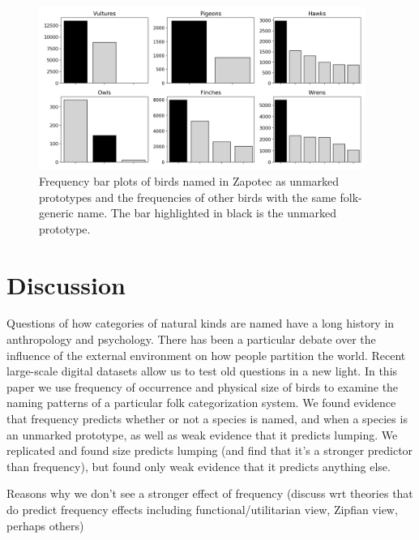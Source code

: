 \documentclass[10pt,letterpaper]{article}
\begin{document}
\begin{figure}[ht!]
  \begin{center}
    \includegraphics[width=0.95\textwidth]{./figures/prototypes-barplots-all.png}
        \caption{Frequency bar plots of birds named in Zapotec as unmarked prototypes and the frequencies of other birds with the same folk-generic name. The bar highlighted in black is the unmarked prototype.}
        \label{fig-freq-prototype-all}
  \end{center}
\end{figure}






\section{Discussion}


Questions of how categories of natural kinds are named have a long history in anthropology and psychology. There has been a particular debate over the influence of the external environment on how people partition the world. Recent large-scale digital datasets allow us to test old questions in a new light. In this paper we use frequency of occurrence and physical size of birds to examine the naming patterns of a particular folk categorization system. We found evidence that frequency predicts whether or not a species is named, and when a species is an unmarked prototype, as well as weak evidence that it predicts lumping. We replicated  and found size predicts lumping (and find that it's a stronger predictor than frequency), but found only weak evidence that it predicts anything else.

Reasons why we don’t see a stronger effect of frequency (discuss wrt theories that do predict frequency effects including functional/utilitarian view, Zipfian view, perhaps others)
\end{document}
